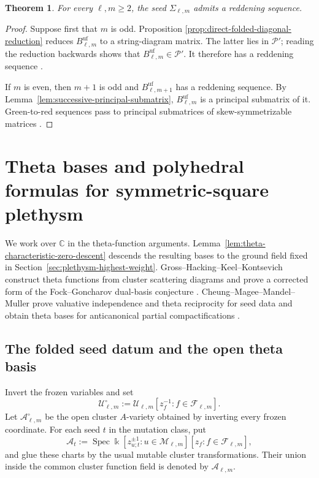\documentclass[11pt]{amsart}
\newtheorem{theorem}{Theorem}[section]
\theoremstyle{definition}
\theoremstyle{remark}
\newcommand{\kk}{\Bbbk}
\newcommand{\cU}{\mathcal U}
\begin{document}
\begin{theorem}\label{thm:reddening}
For every $\ell,m\ge2$, the seed $\Sigma_{\ell,m}$ admits a reddening
sequence.
\end{theorem}

\begin{proof}
Suppose first that $m$ is odd.  Proposition
\ref{prop:direct-folded-diagonal-reduction} reduces
$B_{\ell,m}^{\mathrm{uf}}$ to a string-diagram matrix.  The latter lies in
$\mathscr P'$; reading the reduction backwards shows that
$B_{\ell,m}^{\mathrm{uf}}\in\mathscr P'$.  It therefore has a reddening
sequence \cite[Theorem~4.8 and Corollary~4.9]{CaoString}.

If $m$ is even, then $m+1$ is odd and
$B_{\ell,m+1}^{\mathrm{uf}}$ has a reddening sequence.  By
Lemma~\ref{lem:successive-principal-submatrix},
$B_{\ell,m}^{\mathrm{uf}}$ is a principal submatrix of it.  Green-to-red
sequences pass to principal submatrices of skew-symmetrizable matrices
\cite[Lemma~4.9]{CaoLi}.
\end{proof}

\section{Theta bases and polyhedral formulas for symmetric-square plethysm}
\label{sec:polyhedral-plethysm}

We work over $\mathbb C$ in the theta-function arguments.  Lemma~\ref{lem:theta-characteristic-zero-descent} descends the resulting bases to the ground field fixed in
Section~\ref{sec:plethysm-highest-weight}.  Gross--Hacking--Keel--Kontsevich
construct theta functions from cluster scattering diagrams and prove a
corrected form of the Fock--Goncharov dual-basis conjecture
\cite[Introduction, Sections~7--8]{GHKK}.  Cheung--Magee--Mandel--Muller
prove valuative independence and theta reciprocity for seed data and obtain
theta bases for anticanonical partial compactifications
\cite{CMMM}.

\subsection{The folded seed datum and the open theta basis}

Invert the frozen variables and set
\[ \cU_{\ell,m}^{\circ} :=\cU_{\ell,m}[z_f^{-1}:f\in\mathscr F_{\ell,m}]. \]
Let $\mathcal A_{\ell,m}^{\circ}$ be the open cluster $A$-variety obtained
by inverting every frozen coordinate.  For each seed $t$ in the mutation
class, put
\[ \mathcal A_t :=\operatorname{Spec} \kk[z_{u;t}^{\pm1}:u\in\mathscr M_{\ell,m}] [z_f:f\in\mathscr F_{\ell,m}], \]
and glue these charts by the usual mutable cluster transformations.  Their
union inside the common cluster function field is denoted by
$\mathcal A_{\ell,m}$.
\end{document}
